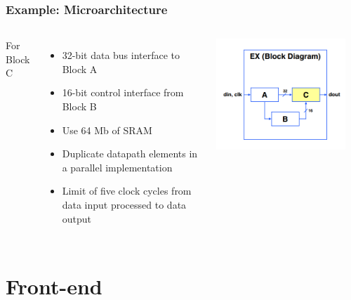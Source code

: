 \documentclass[compress]{beamer}
\begin{document}
\begin{frame}
	\frametitle{Example: Microarchitecture}
	\begin{columns}	
		For Block C
		\begin{itemize}
			\item 32-bit data bus interface to
			Block A
			\item 16-bit control interface from
			Block B
			\item Use 64 Mb of SRAM
			\item Duplicate datapath elements in a
			parallel implementation
			\item Limit of five clock cycles from data
			input processed to data output
		\end{itemize}
		\begin{center}
			\includegraphics[width=0.9\textwidth]{block_micro}
		\end{center}
	\end{columns}
\end{frame}
\section[Front]{Front-end}
\end{document}
